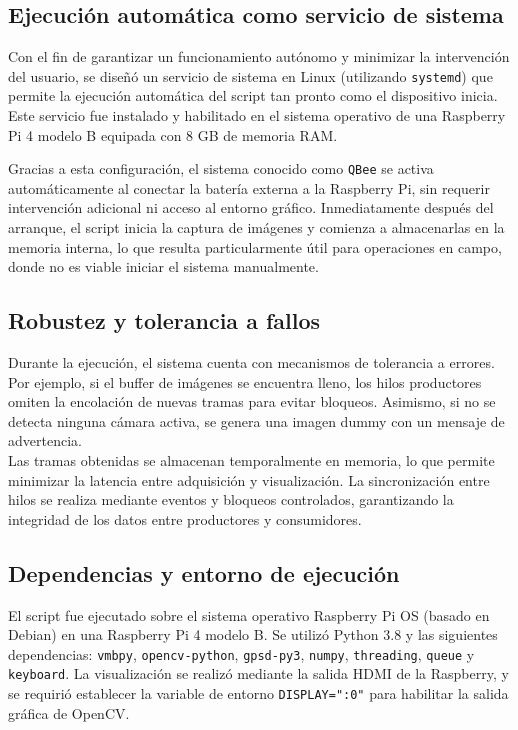     \subsection{Ejecución automática como servicio de sistema}
    
    Con el fin de garantizar un funcionamiento autónomo y minimizar la intervención del usuario, se diseñó un servicio de sistema en Linux (utilizando \texttt{systemd}) que permite la ejecución automática del script tan pronto como el dispositivo inicia. Este servicio fue instalado y habilitado en el sistema operativo de una Raspberry Pi 4 modelo B equipada con 8 GB de memoria RAM.
    
    Gracias a esta configuración, el sistema conocido como \texttt{QBee} se activa automáticamente al conectar la batería externa a la Raspberry Pi, sin requerir intervención adicional ni acceso al entorno gráfico. Inmediatamente después del arranque, el script inicia la captura de imágenes y comienza a almacenarlas en la memoria interna, lo que resulta particularmente útil para operaciones en campo, donde no es viable iniciar el sistema manualmente.
    
    \subsection{Robustez y tolerancia a fallos}
    
    Durante la ejecución, el sistema cuenta con mecanismos de tolerancia a errores. Por ejemplo, si el buffer de imágenes se encuentra lleno, los hilos productores omiten la encolación de nuevas tramas para evitar bloqueos. Asimismo, si no se detecta ninguna cámara activa, se genera una imagen dummy con un mensaje de advertencia.\\
    
    Las tramas obtenidas se almacenan temporalmente en memoria, lo que permite minimizar la latencia entre adquisición y visualización. La sincronización entre hilos se realiza mediante eventos y bloqueos controlados, garantizando la integridad de los datos entre productores y consumidores.
    
    \subsection{Dependencias y entorno de ejecución}
    
    El script fue ejecutado sobre el sistema operativo Raspberry Pi OS (basado en Debian) en una Raspberry Pi 4 modelo B. Se utilizó Python 3.8 y las siguientes dependencias: \texttt{vmbpy}, \texttt{opencv-python}, \texttt{gpsd-py3}, \texttt{numpy}, \texttt{threading}, \texttt{queue} y \texttt{keyboard}. La visualización se realizó mediante la salida HDMI de la Raspberry, y se requirió establecer la variable de entorno \texttt{DISPLAY=":0"} para habilitar la salida gráfica de OpenCV.

